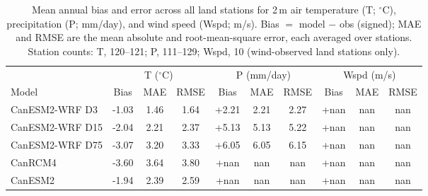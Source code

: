 \begin{table}[!htbp]
\caption{\label{table:bias} Mean annual bias and error across all land stations for
2\,m air temperature (T; $^\circ$C), precipitation (P; mm/day), and wind speed (Wspd; m/s).
Bias $=$ model $-$ obs (signed); MAE and RMSE are the mean absolute and root-mean-square error, each averaged over stations. Station counts: T, 120--121; P, 111--129; Wspd, 10 (wind-observed land stations only).}
\centering
\begin{tabular}{l ccc ccc ccc}
\hline
 & \multicolumn{3}{c}{T ($^\circ$C)} & \multicolumn{3}{c}{P (mm/day)} & \multicolumn{3}{c}{Wspd (m/s)} \\
\cline{2-4}\cline{5-7}\cline{8-10}
Model & Bias & MAE & RMSE & Bias & MAE & RMSE & Bias & MAE & RMSE \\
\hline
CanESM2-WRF D3   & -1.03 & 1.46 & 1.64 & +2.21 & 2.21 & 2.27 & +nan & nan & nan \\
CanESM2-WRF D15  & -2.04 & 2.21 & 2.37 & +5.13 & 5.13 & 5.22 & +nan & nan & nan \\
CanESM2-WRF D75  & -3.07 & 3.20 & 3.33 & +6.05 & 6.05 & 6.15 & +nan & nan & nan \\
CanRCM4          & -3.60 & 3.64 & 3.80 & +nan & nan & nan & +nan & nan & nan \\
CanESM2          & -1.94 & 2.39 & 2.59 & +nan & nan & nan & +nan & nan & nan \\
\hline
\end{tabular}
\end{table}
